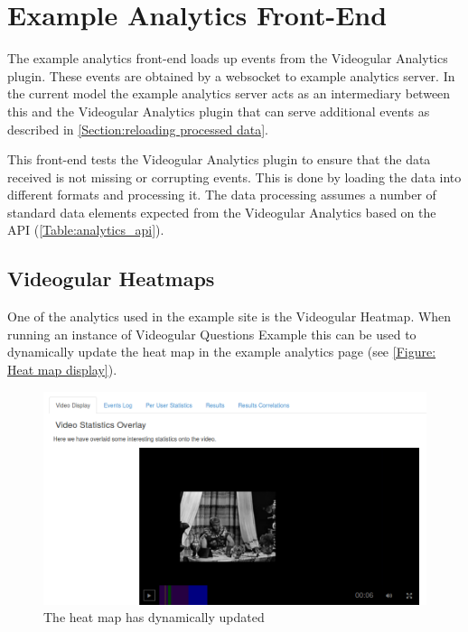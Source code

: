 \section{Example Analytics Front-End}

The example analytics front-end loads up events from the \gls{Videogular} Analytics plugin. These events are obtained by a websocket to example analytics server. In the current model the example analytics server acts as an intermediary between this and the \gls{Videogular} Analytics plugin that can serve additional events as described in \autoref{Section:reloading processed data}.

This front-end tests the \gls{Videogular} Analytics plugin to ensure that the data received is not missing or corrupting events. This is done by loading the data into different formats and processing it. The data processing assumes a number of standard data elements expected from the Videogular Analytics based on the \gls{API} (\autoref{Table:analytics_api}).

\subsection{Videogular Heatmaps}
\label{Subsubsection:Videogular Heatmaps in example}

One of the analytics used in the example site is the \gls{Videogular} Heatmap. When running an instance of \gls{Videogular} Questions Example this can be used to dynamically update the heat map in the example analytics page (see \autoref{Figure: Heat map display}).

\begin{figure}[h]
	\centering
		\includegraphics[scale=0.4]{../figures/heatmapDisplay.png}
	\caption{\label{Figure: Heat map display} The heat map has dynamically updated}
\end{figure}

